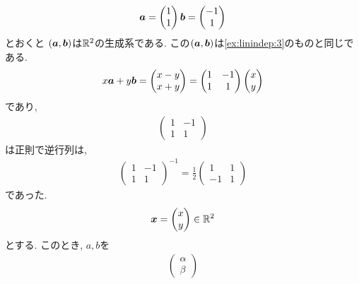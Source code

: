 \begin{example}
  \label{ex:gens:3}
  \begin{align*}
    \boldsymbol{a}=\begin{pmatrix}1\\1\end{pmatrix}
    \boldsymbol{b}=\begin{pmatrix}-1\\1\end{pmatrix}
  \end{align*}
  とおくと
  $(\boldsymbol{a},\boldsymbol{b})$は$\mathbb{R}^2$の生成系である.
  この$(\boldsymbol{a},\boldsymbol{b})$は\cref{ex:linindep:3}のものと同じである.
  \begin{align*}
    x\boldsymbol{a}+y\boldsymbol{b}=
    \begin{pmatrix}
      x-y\\x+y
    \end{pmatrix}
    =
    \begin{pmatrix}
      1&-1\\1&1
    \end{pmatrix}
    \begin{pmatrix}
      x\\y
    \end{pmatrix}
  \end{align*}
  であり,
  \begin{align*}
    \begin{pmatrix}
      1&-1\\1&1
    \end{pmatrix}
  \end{align*}
  は正則で逆行列は,
  \begin{align*}
    \begin{pmatrix}
      1&-1\\1&1
    \end{pmatrix}^{-1}
=    \frac{1}{2}
    \begin{pmatrix}
      1&1\\-1&1
    \end{pmatrix}
  \end{align*}
  であった.
  \begin{align*}
    \boldsymbol{x}=
   \begin{pmatrix}
      x\\y
    \end{pmatrix}\in\mathbb{R}^2
  \end{align*}
  とする.
  このとき, $a,b$を
  \begin{align*}
    \begin{pmatrix}
      \alpha\\\beta
    \end{pmatrix}

\end{align*}
\end{example}
